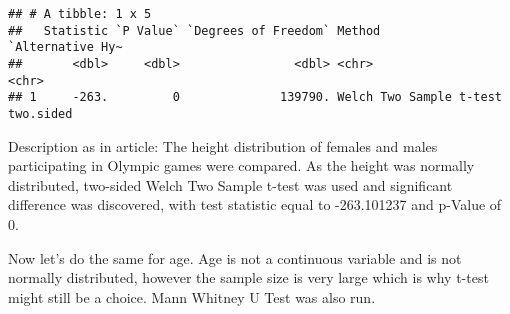 \documentclass[
]{article}
\newenvironment{Shaded}{\begin{snugshade}}{\end{snugshade}}
\newcommand{\AttributeTok}[1]{\textcolor[rgb]{0.77,0.63,0.00}{#1}}
\newcommand{\CommentTok}[1]{\textcolor[rgb]{0.56,0.35,0.01}{\textit{#1}}}
\newcommand{\DecValTok}[1]{\textcolor[rgb]{0.00,0.00,0.81}{#1}}
\newcommand{\FloatTok}[1]{\textcolor[rgb]{0.00,0.00,0.81}{#1}}
\newcommand{\FunctionTok}[1]{\textcolor[rgb]{0.00,0.00,0.00}{#1}}
\newcommand{\NormalTok}[1]{#1}
\newcommand{\SpecialCharTok}[1]{\textcolor[rgb]{0.00,0.00,0.00}{#1}}
\newcommand{\StringTok}[1]{\textcolor[rgb]{0.31,0.60,0.02}{#1}}
\begin{document}
\begin{verbatim}
## # A tibble: 1 x 5
##   Statistic `P Value` `Degrees of Freedom` Method                  `Alternative Hy~
##       <dbl>     <dbl>                <dbl> <chr>                   <chr>           
## 1     -263.         0              139790. Welch Two Sample t-test two.sided
\end{verbatim}

Description as in article: The height distribution of females and males
participating in Olympic games were compared. As the height was normally
distributed, two-sided Welch Two Sample t-test was used and significant
difference was discovered, with test statistic equal to -263.101237 and
p-Value of 0.

Now let's do the same for age. Age is not a continuous variable and is
not normally distributed, however the sample size is very large which is
why t-test might still be a choice. Mann Whitney U Test was also run.

\begin{Shaded}
\end{Shaded}
\end{document}
